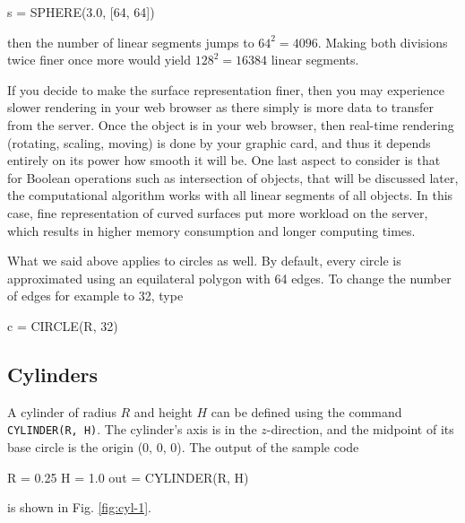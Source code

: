 \begin{bluecode}
s = SPHERE(3.0, [64, 64])
\end{bluecode}
then the number of linear segments jumps to $64^2 = 4096$. Making 
both divisions twice finer once more would yield $128^2 = 16384$ linear
segments. 

If you decide to make the surface representation finer, then you may experience 
slower rendering in your web browser as there simply is more data 
to transfer from the server. Once the object is in your web browser,
then real-time rendering (rotating, scaling, moving) is done by your 
graphic card, and thus it depends entirely on its power how smooth
it will be. One last aspect to consider is that for Boolean operations 
such as intersection of objects, that will be discussed later, the 
computational algorithm works with all linear segments of all objects. 
In this case, fine representation of curved surfaces put more workload 
on the server, which results in higher memory consumption and longer 
computing times. 

What we said above applies to circles as well. By default, every circle 
is approximated using an equilateral polygon 
with 64 edges. To change the number of edges for example to 32, type

\begin{bluecode}
c = CIRCLE(R, 32)
\end{bluecode}

\subsection{Cylinders}

A cylinder of radius $R$ and height $H$ can be defined using 
the command {\tt CYLINDER(R, H)}. The cylinder's axis is in 
the $z$-direction, and the midpoint of its base circle is the 
origin (0, 0, 0). The output of the sample code

\begin{bluecode}
R = 0.25
H = 1.0
out = CYLINDER(R, H)
\end{bluecode}
is shown in Fig. \ref{fig:cyl-1}.

